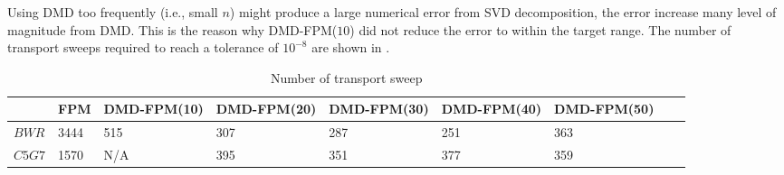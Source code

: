 Using DMD too frequently (i.e., small $n$) might produce a large numerical error from SVD decomposition, the error increase many level of magnitude from DMD.
This is the reason why DMD-FPM($10$) did not reduce the error to within the target range.
The number of transport sweeps required to reach a tolerance of $10^{-8}$ are shown in .

\begin{table}[htb]
  \centering
  \small
  \caption{Number of transport sweep}
  \begin{tabular}{lllllllll}\toprule
      & FPM  & DMD-FPM(10)& DMD-FPM(20)& DMD-FPM(30)& DMD-FPM(40)& DMD-FPM(50)
\\ \midrule
$BWR$  & 3444 & 515 & 307 & 287 & 251 & 363
\\
$C5G7$  & 1570  & N/A & 395 & 351 & 377 & 359
\\
\bottomrule
\end{tabular}
  \label{tab:widetable}
\end{table}

